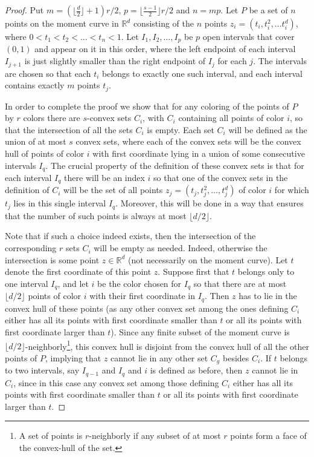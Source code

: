 \documentclass[10pt,a4paper]{amsart}
\begin{document}
\begin{proof}
Put $m=(\lfloor \frac{d}{2}\rfloor+1)r/2$,
$p=\lfloor \frac{s-1}{2} \rfloor r/2$ and $n=mp$.
Let $P$ be a set of $n$ points on the moment curve
in  $\mathbb{R}^d$ consisting of the $n$ points
$z_i=(t_i,t_i^2, \ldots t_i^d)$, where $0 <t_1<t_2 <  \ldots
<t_n<1$. Let  $I_1,I_2, \ldots ,I_p$ be $p$ open intervals that cover
$(0,1)$ and appear on it in this order, 
where the left endpoint of each interval $I_{j+1}$ is
just slightly smaller than the right endpoint of $I_j$ for each $j$.
The intervals are chosen so that each $t_i$ belongs to exactly one
such interval, and each interval contains exactly $m$ points $t_j$.

In order to complete the proof we show
that for any coloring of the points of $P$  by $r$ colors
there are $s$-convex sets $C_i$, with $C_i$ containing all points
of color $i$, so that the intersection of all the sets $C_i$ is
empty. Each set $C_i$  will be defined as the union of at most
$s$ convex sets, where each of the convex sets will be 
the convex hull of points of color $i$ with first coordinate 
lying in a union of some consecutive intervals $I_q$. The crucial
property of the definition of these convex sets is that for 
each interval $I_q$  there will be an index $i$ so that one of the
convex sets in the definition of $C_i$ will be the set of all
points $z_j=(t_j,t_j^2, \ldots ,t_j^d)$
of color $i$ for which $t_j$ lies in this single interval $I_q$.
Moreover, this will be done in a way that ensures that the number of such
points is always at most $\lfloor d/2 \rfloor$.  

Note that if such
a choice indeed exists, then the intersection of the corresponding 
$r$ sets $C_i$ will be empty as needed. Indeed, otherwise the
intersection is some point $z \in \mathbb{R}^d$ (not necessarily on
the moment curve). Let $t$ denote the first coordinate of this
point $z$. Suppose first that $t$ 
belongs only to one interval $I_q$, and let
$i$ be the color chosen for $I_q$ 
so that there are at most $\lfloor d/2 \rfloor$
points of color $i$ with their first coordinate in  $I_q$. 
Then $z$ has to lie in the convex hull of these points (as any
other convex set among the ones defining 
$C_i$ either has all its points with
first coordinate smaller than $t$ or all its points with 
first coordinate larger than $t$). Since any finite subset of the moment curve is
$\lfloor d/2 \rfloor$-neighborly\footnote{A set of points is $r$-neighborly if any subset of at most $r$ points form a face of the convex-hull of the set.}, this convex hull is disjoint from
the convex hull of all the other points of $P$, implying that
$z$ cannot lie in any other set $C_g$ besides $C_i$. If $t$ belongs
to two intervals, say $I_{q-1}$ and $I_q$  and $i$ is defined as
before, then $z$ cannot lie in $C_i$, since in this case any convex
set among those defining $C_i$
either has all its points with
first coordinate smaller than $t$ or all its points with 
first coordinate larger than $t$. 


\end{proof}
\end{document}
